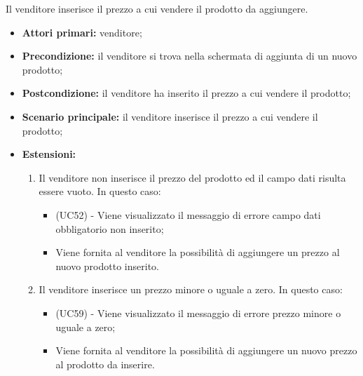 Il venditore inserisce il prezzo a cui vendere il prodotto da aggiungere.
\begin{itemize}
    \item \textbf{Attori primari:} venditore;
    \item \textbf{Precondizione:} il venditore si trova nella schermata di aggiunta di un nuovo prodotto;
    \item \textbf{Postcondizione:} il venditore ha inserito il prezzo a cui vendere il prodotto;
    \item \textbf{Scenario principale:} il venditore inserisce il prezzo a cui vendere il prodotto;
    \item \textbf{Estensioni:}
    \begin{enumerate}[label=\lett]
    	\item Il venditore non inserisce il prezzo del prodotto ed il campo dati risulta essere vuoto. In questo caso:
    	\begin{itemize}
    		\item (UC52) - Viene visualizzato il messaggio di errore campo dati obbligatorio non inserito;
    		\item Viene fornita al venditore la possibilità di aggiungere un prezzo al nuovo prodotto inserito.
    	\end{itemize}
    	\item Il venditore inserisce un prezzo minore o uguale a zero. In questo caso:
    	\begin{itemize}
    		\item (UC59) - Viene visualizzato il messaggio di errore prezzo minore o uguale a zero;
    		\item Viene fornita al venditore la possibilità di aggiungere un nuovo prezzo al prodotto da inserire.
    	\end{itemize}
    \end{enumerate}
\end{itemize}

